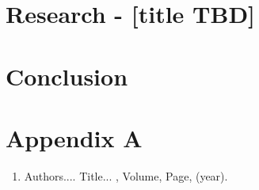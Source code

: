 \documentclass[MS]             %
              {iitmdiss}
\begin{document}
\chapter{ Research - [title TBD]} 


\chapter{Conclusion}


\appendix

\chapter{Appendix A}



\begin{singlespace}
  
\end{singlespace}



\listofpapers

\begin{enumerate}  
\item Authors....  \newblock
 Title...
  , Volume,
  Page, (year).
\end{enumerate}  
\end{document}
